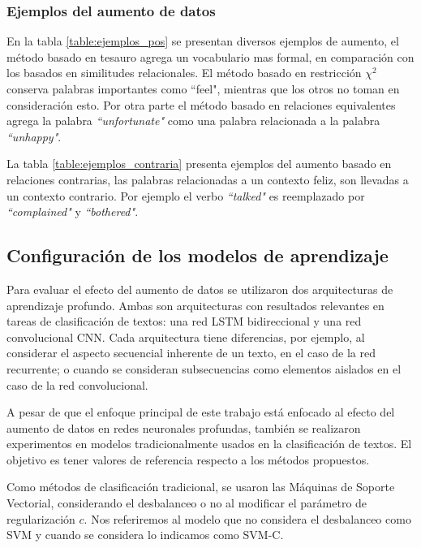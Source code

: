 

\subsubsection{Ejemplos del aumento de datos}
En la tabla \ref{table:ejemplos_pos} se presentan diversos ejemplos de aumento, el método basado en tesauro agrega un vocabulario mas formal, en comparación con los basados en similitudes relacionales. El método basado en restricción $\chi^2$ conserva palabras importantes como ``feel", mientras que los otros no toman en consideración esto. Por otra parte el método basado en relaciones equivalentes agrega la palabra \textit{``unfortunate"} como una palabra relacionada a la palabra \textit{``unhappy"}.

La tabla \ref{table:ejemplos_contraria} presenta ejemplos del aumento basado en relaciones contrarias, las palabras relacionadas a un contexto feliz, son llevadas a un contexto contrario. Por ejemplo el verbo \textit{``talked"} es reemplazado por \textit{``complained"} y \textit{``bothered"}.




 
\subsection{Configuración de los modelos de aprendizaje}

Para evaluar el efecto del aumento de datos se utilizaron dos arquitecturas de aprendizaje profundo. Ambas son arquitecturas con resultados relevantes en tareas de clasificación de textos: una red LSTM bidireccional y una red convolucional CNN. Cada arquitectura tiene diferencias, por ejemplo, al considerar el aspecto secuencial inherente de un texto, en el caso de la red recurrente; o cuando se consideran subsecuencias como elementos aislados en el caso de la red convolucional.

A pesar de que el enfoque principal de este trabajo está enfocado al efecto del aumento de datos en redes neuronales profundas, también se realizaron experimentos en modelos tradicionalmente usados en la clasificación de textos. El objetivo es tener valores de referencia respecto a los métodos propuestos. 

Como métodos de clasificación tradicional, se usaron las Máquinas de Soporte Vectorial, considerando el desbalanceo o no al modificar el parámetro de regularización $c$. Nos referiremos al modelo que no considera el desbalanceo como SVM y cuando se considera lo indicamos como SVM-C. 


